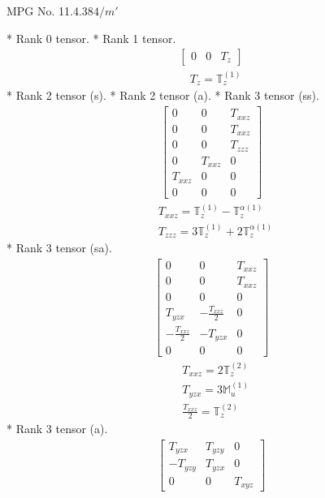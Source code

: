 \documentclass[fleqn,8pt,landscape]{jsarticle}
\begin{document}
\setcounter{MaxMatrixCols}{32}

\renewcommand{\tablename}{Table~}
\renewcommand{\figurename}{Figure~}
\begin{center}
\LARGE
MPG No. 11.4.38\quad$4/m'$
\end{center}
* Rank 0 tensor.
* Rank 1 tensor.
\begin{align*}
\begin{bmatrix} 0 & 0 & T_{z} \end{bmatrix}
\end{align*}
\begin{align*}
& T_{z} = \mathbb{T}_{z}^{(1)}
\end{align*}
* Rank 2 tensor (s).
* Rank 2 tensor (a).
* Rank 3 tensor (ss).
\begin{align*}
\begin{bmatrix} 0 & 0 & T_{xxz} \\ 0 & 0 & T_{xxz} \\ 0 & 0 & T_{zzz} \\ 0 & T_{xxz} & 0 \\ T_{xxz} & 0 & 0 \\ 0 & 0 & 0 \end{bmatrix}
\end{align*}
\begin{align*}
& T_{xxz} = \mathbb{T}_{z}^{(1)} - \mathbb{T}_{z}^{\alpha(1)} \\
& T_{zzz} = 3 \mathbb{T}_{z}^{(1)} + 2 \mathbb{T}_{z}^{\alpha(1)}
\end{align*}
* Rank 3 tensor (sa).
\begin{align*}
\begin{bmatrix} 0 & 0 & T_{xxz} \\ 0 & 0 & T_{xxz} \\ 0 & 0 & 0 \\ T_{yzx} & - \frac{T_{xxz}}{2} & 0 \\ - \frac{T_{xxz}}{2} & - T_{yzx} & 0 \\ 0 & 0 & 0 \end{bmatrix}
\end{align*}
\begin{align*}
& T_{xxz} = 2 \mathbb{T}_{z}^{(2)} \\
& T_{yzx} = 3 \mathbb{M}_{u}^{(1)} \\
& \frac{T_{xxz}}{2} = \mathbb{T}_{z}^{(2)}
\end{align*}
* Rank 3 tensor (a).
\begin{align*}
\begin{bmatrix} T_{yzx} & T_{yzy} & 0 \\ - T_{yzy} & T_{yzx} & 0 \\ 0 & 0 & T_{xyz} \end{bmatrix}
\end{align*}
\end{document}
